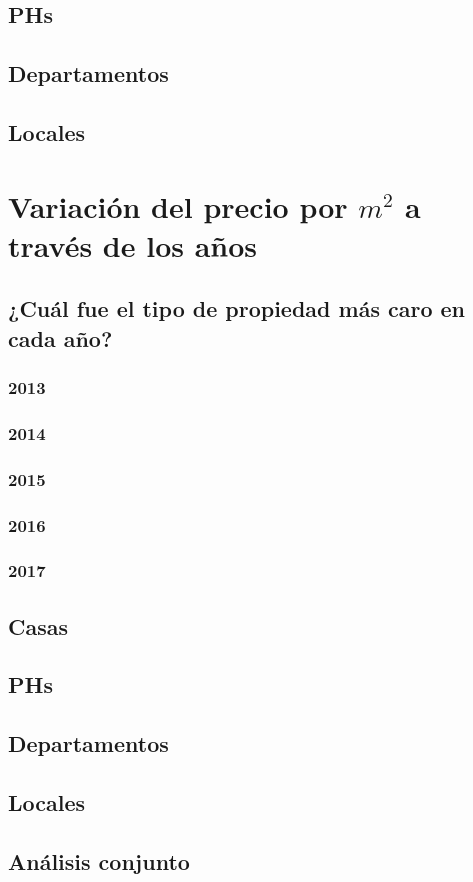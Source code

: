 \documentclass[a4paper, 10pt]{article}
\begin{document}
			\subsection{PHs}
			\subsection{Departamentos}
			\subsection{Locales}
		\section{Variación del precio por $m^2$ a través de los años}
			\subsection{¿Cuál fue el tipo de propiedad más caro en cada año?}
				\subsubsection{2013}
				\subsubsection{2014}
				\subsubsection{2015}
				\subsubsection{2016}
				\subsubsection{2017}
			\subsection{Casas}
			\subsection{PHs}
			\subsection{Departamentos}
			\subsection{Locales}
			\subsection{Análisis conjunto}
		
\end{document}
